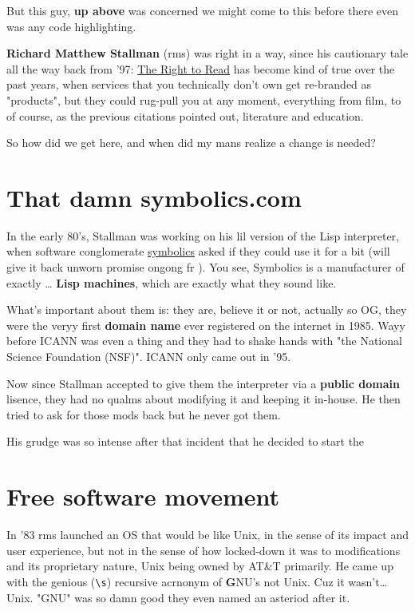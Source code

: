 \documentclass[sigplan,screen]{acmart}
\begin{document}
But this guy, \textbf{up above} was concerned we might come to this before there even was any code highlighting.

\textbf{Richard Matthew Stallman} (rms) was right in a way, since his cautionary tale all the way back from '97: \href{https://www.gnu.org/philosophy/right-to-read.html}{The Right to Read}\cite{Stallman1997TheRT} has become kind of true over the past years, when services that you technically don't own get re-branded as "products"\cite{product}, but they could rug-pull you at any moment, everything from film\cite{jellyfin}, to of course, as the previous citations pointed out, literature and education.

So how did we get here, and when did my mans realize a change is needed?

\section{That damn symbolics.com}
In the early 80's, Stallman was working on his lil version of the Lisp interpreter, when software conglomerate \href{https://symbolics.com}{symbolics} asked if they could use it for a bit (will give it back unworn promise ongong fr ). You see, Symbolics is a manufacturer of exactly \ldots \textbf{ Lisp machines}, which are exactly what they sound like.

What's important about them is: they are, believe it or not, actually so OG, they were the veryy first \textbf{domain name} ever registered on the internet in 1985. Wayy before ICANN was even a thing and they had to shake hands with "the National Science Foundation (NSF)". ICANN only came out in '95. \cite{national-science-foundation}

Now since Stallman accepted to give them the interpreter via a \textbf{public domain} lisence, they had no qualms about modifying it and keeping it in-house. He then tried to ask for those mods back but he never got them.

His grudge was so intense after that incident that he decided to start the

\section{Free software movement}
In '83 rms launched an OS that would be like Unix, in the sense of its impact and user experience, but not in the sense of how locked-down it was to modifications and its proprietary nature, Unix being owned by AT\&T primarily. He came up with the genious (\verb|\s|) recursive acrnonym of \textbf{G}NU's not Unix. Cuz it wasn't\ldots Unix. "GNU" was so damn good they even named an asteriod after it. \cite{gnu-asteriod}
\end{document}
